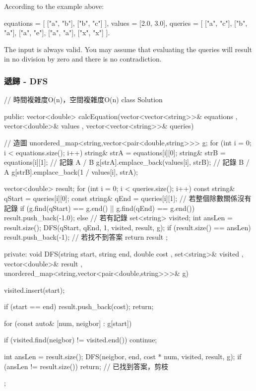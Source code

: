 According to the example above:

\begin{Code}
equations = [ ["a", "b"], ["b", "c"] ],
values = [2.0, 3.0],
queries = [ ["a", "c"], ["b", "a"], ["a", "e"], ["a", "a"], ["x", "x"] ]. 
\end{Code}

The input is always valid. You may assume that evaluating the queries will result in no division by zero and there is no contradiction.

\subsubsection{遞歸 - DFS}
\begin{Code}
// 時間複雜度O(n)，空間複雜度O(n)
class Solution {
public:
    vector<double> calcEquation(vector<vector<string>>& equations
                                , vector<double>& values
                                , vector<vector<string>>& queries){
        // 造圖
        unordered_map<string,vector<pair<double,string>>> g;
        for (int i = 0; i < equations.size(); i++)
        {
            string& strA = equations[i][0];
            string& strB = equations[i][1];
            // 記錄 A / B
            g[strA].emplace_back(values[i], strB);
            // 記錄 B / A
            g[strB].emplace_back(1 / values[i], strA);
        }

        vector<double> result;
        for (int i = 0; i < queries.size(); i++)
        {
            const string& qStart = queries[i][0];
            const string& qEnd = queries[i][1];
            // 若整個除數關係沒有記錄
            if (g.find(qStart) == g.end() || g.find(qEnd) == g.end())
                result.push_back(-1.0);
            else
            {
                // 若有記錄
                set<string> visited;
                int ansLen = result.size();
                DFS(qStart, qEnd, 1, visited, result, g);
                if (result.size() == ansLen)
                    result.push_back(-1); // 若找不到答案
            }
        }
        return result ;
    }
private:
    void DFS(string start, string end, double cost
             , set<string>& visited
             , vector<double>& result
             , unordered_map<string,vector<pair<double,string>>>& g)
    {
        visited.insert(start);

        if (start == end)
        {
            result.push_back(cost);
            return;
        }

        for (const auto& [num, neigbor] : g[start])
        {
            if (visited.find(neigbor) != visited.end()) continue;

            int ansLen = result.size();
            DFS(neigbor, end, cost * num, visited, result, g);
            if (ansLen != result.size()) return; // 已找到答案，剪枝
        }
    }
};
\end{Code}
